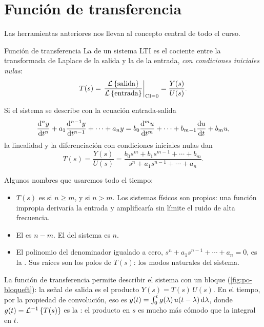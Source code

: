\section{Función de transferencia}
\label{sec:po-ft}

Las herramientas anteriores nos llevan al concepto central de todo el curso.

\begin{definicion}[label=def:po-ft]{Función de transferencia}
La  de un sistema LTI es el cociente entre la transformada de Laplace de la salida y la de la entrada, \emph{con condiciones iniciales nulas}:
\begin{equation}
  T(s)=\left.\frac{\mathcal{L}\left\{\text{salida}\right\}}{\mathcal{L}\left\{\text{entrada}\right\}}\right|_{\text{CI}=0}=\frac{Y(s)}{U(s)}.
\end{equation}
\end{definicion}

Si el sistema se describe con la ecuación entrada-salida
\begin{equation}
  \frac{\mathrm{d}^n y}{\mathrm{d} t^n}+a_1\frac{\mathrm{d}^{n-1}y}{\mathrm{d} t^{n-1}}+\cdots+a_n y
  =b_0\frac{\mathrm{d}^m u}{\mathrm{d} t^m}+\cdots+b_{m-1}\frac{\mathrm{d} u}{\mathrm{d} t}+b_m u,
  \label{eq:po-inout}
\end{equation}
la linealidad y la diferenciación con condiciones iniciales nulas dan
\begin{equation}
  T(s)=\frac{Y(s)}{U(s)}=\frac{b_0s^m+b_1s^{m-1}+\cdots+b_m}{s^n+a_1s^{n-1}+\cdots+a_n}.
  \label{eq:po-ft}
\end{equation}

Algunos nombres que usaremos todo el tiempo:
\begin{itemize}
  \item $T(s)$ es  si $n\geq m$, y  si $n>m$. Los sistemas físicos son propios: una función impropia derivaría la entrada y amplificaría sin límite el ruido de alta frecuencia.
  \item El  es $n-m$. El  del sistema es $n$.
  \item El polinomio del denominador igualado a cero, $s^n+a_1s^{n-1}+\cdots+a_n=0$, es la . Sus raíces son los polos de $T(s)$: los modos naturales del sistema.
\end{itemize}

La función de transferencia permite describir el sistema con un bloque (\cref{fig:po-bloqueft}): la señal de salida es el producto $Y(s)=T(s)\,U(s)$. En el tiempo, por la propiedad de convolución, eso es $y(t)=\int_0^t g(\lambda)\,u(t-\lambda)\,\mathrm{d}\lambda$, donde $g(t)=\mathcal{L}^{-1}\left\{T(s)\right\}$ es la : el producto en $s$ es mucho más cómodo que la integral en $t$.


